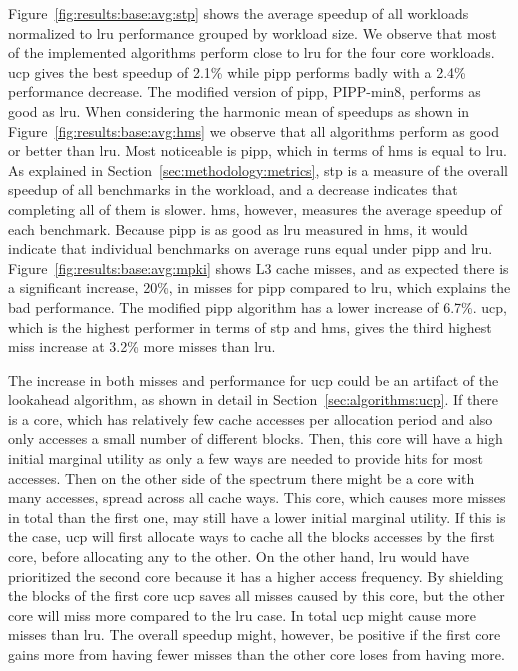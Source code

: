 Figure~\ref{fig:results:base:avg:stp} shows the average speedup of all workloads normalized to \gls{lru} performance grouped by workload size.
We observe that most of the implemented algorithms perform close to \gls{lru} for the four core workloads.
\gls{ucp} gives the best speedup of 2.1\% while \gls{pipp} performs badly with a 2.4\% performance decrease. 
The modified version of \gls{pipp}, PIPP-min8, performs as good as \gls{lru}.
When considering the harmonic mean of speedups as shown in Figure~\ref{fig:results:base:avg:hms} we observe that all algorithms perform as good or better than \gls{lru}.  
Most noticeable is \gls{pipp}, which in terms of \gls{hms} is equal to \gls{lru}.
As explained in Section~\ref{sec:methodology:metrics}, \gls{stp}  is a measure of the overall speedup of all benchmarks in the workload, and a decrease indicates that completing all of them is slower.
\gls{hms}, however, measures the average speedup of each benchmark.
Because \gls{pipp} is as good as \gls{lru} measured in \gls{hms}, it would indicate that individual benchmarks on average runs equal under \gls{pipp} and \gls{lru}.
Figure~\ref{fig:results:base:avg:mpki} shows L3 cache misses, and as expected there is a significant increase, 20\%, in misses for \gls{pipp} compared to \gls{lru}, which explains the bad performance. 
The modified \gls{pipp} algorithm has a lower increase of 6.7\%.
\gls{ucp}, which is the highest performer in terms of \gls{stp} and \gls{hms}, gives the third highest miss increase at 3.2\% more misses than \gls{lru}. 

The increase in both misses and performance for \gls{ucp} could be an artifact of the lookahead algorithm, as shown in detail in Section~\ref{sec:algorithms:ucp}.
If there is a core, which has relatively few cache accesses per allocation period and also only accesses a small number of different blocks.
Then, this core will have a high initial marginal utility as only a few ways are needed to provide hits for most accesses.
Then on the other side of the spectrum there might be a core with many accesses, spread across all cache ways.
This core, which causes more misses in total than the first one, may still have a lower initial marginal utility.
If this is the case, \gls{ucp} will first allocate ways to cache all the blocks accesses by the first core, before allocating any to the other.
On the other hand, \gls{lru} would have prioritized the second core because it has a higher access frequency.
By shielding the blocks of the first core \gls{ucp} saves all misses caused by this core, but the other core will miss more compared to the \gls{lru} case.
In total \gls{ucp} might cause more misses than \gls{lru}.
The overall speedup might, however, be positive if the first core gains more from having fewer misses than the other core loses from having more.

